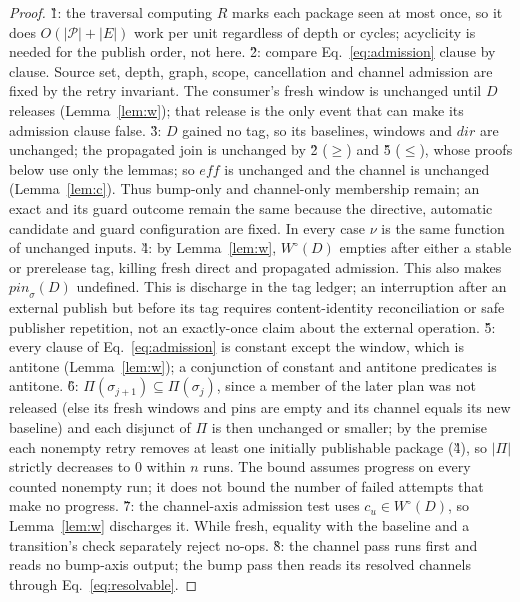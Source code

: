 \begin{proof}
\G{1}: the traversal computing $R$ marks each package seen at most
once, so it does $O(|\mathcal{P}|{+}|E|)$ work per unit regardless of
depth or cycles; acyclicity is needed for the publish order, not here.
\G{2}: compare Eq.~\ref{eq:admission} clause by clause. Source set,
depth, graph, scope, cancellation and channel admission are fixed by the
retry invariant. The consumer's fresh window is unchanged until $D$
releases (Lemma~\ref{lem:w}); that release is the only event that can
make its admission clause false.
\G{3}: $D$ gained no tag, so its baselines, windows and
$\mathit{dir}$ are unchanged; the propagated join is unchanged by \G{2}
($\geq$) and \G{5} ($\leq$), whose proofs below use only the lemmas; so
$\mathit{eff}$ is unchanged and the channel is unchanged
(Lemma~\ref{lem:c}). Thus bump-only and channel-only membership remain;
an exact  and its guard outcome remain the same because the
directive, automatic candidate and guard configuration are fixed. In every
case $\nu$ is the same function of unchanged inputs.
\G{4}: by Lemma~\ref{lem:w}, $W^\circ(D)$ empties after either a stable
or prerelease tag, killing fresh direct and propagated admission. This
also makes $\mathit{pin}_\sigma(D)$ undefined. This is discharge in the tag
ledger; an interruption after an external publish
but before its tag requires content-identity reconciliation or safe publisher repetition, not
an exactly-once claim about the external operation.
\G{5}: every clause of Eq.~\ref{eq:admission} is constant except the
window, which is antitone (Lemma~\ref{lem:w}); a conjunction of
constant and antitone predicates is antitone.
\G{6}: $\Pi(\sigma_{j+1}) \subseteq \Pi(\sigma_j)$, since a member of
the later plan was not released (else its fresh windows and pins are empty and its channel equals its new baseline) and each disjunct of
$\Pi$ is then unchanged or smaller; by the premise each nonempty retry
removes at least one initially publishable package (\G{4}), so $|\Pi|$
strictly decreases to $0$ within
$n$ runs. The bound assumes progress on every counted nonempty run; it does not bound
the number of failed attempts that make no progress.
\G{7}: the channel-axis admission test uses $c_u\in W^\circ(D)$, so
Lemma~\ref{lem:w} discharges it. While fresh, equality with the baseline
and a transition's  check separately reject no-ops.
\G{8}: the channel pass runs first and reads no bump-axis output; the bump
pass then reads its resolved channels through Eq.~\ref{eq:resolvable}.
\end{proof}


